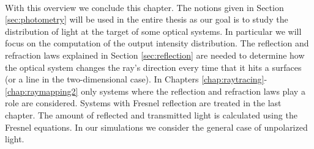  \\
\indent With this overview we conclude this chapter. The notions given in Section \ref{sec:photometry} will be used in the entire thesis as our goal is to study the distribution of light at the target of some optical systems. In particular we will focus on the computation of the output intensity distribution. The reflection and refraction laws explained in Section \ref{sec:reflection} are needed to determine how the optical system changes the ray's direction every time that it hits a surfaces (or a line in the two-dimensional case). In Chapters \ref{chap:raytracing}-\ref{chap:raymapping2} only systems where the reflection and refraction laws play a role are considered. Systems with Fresnel reflection are treated in the last chapter. The amount of reflected and transmitted light is calculated using the Fresnel equations. In our simulations we consider the general case of unpolarized light. 
